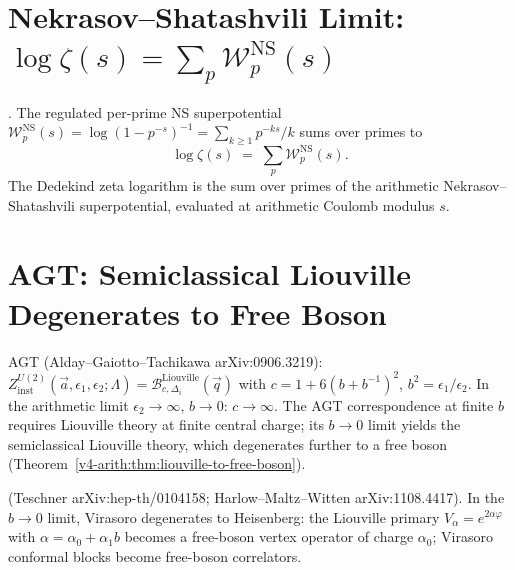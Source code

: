 \section{Nekrasov--Shatashvili Limit: \(\log\zeta(s)=\sum_{p}\mathcal{W}^{\mathrm{NS}}_{p}(s)\)}
\label{v4-arith:nk:NS-limit}

\begin{theorem}
\label{v4-arith:thm:NS-identity}
\ClaimStatusProvedHere. The regulated per-prime NS superpotential
\(\mathcal{W}^{\mathrm{NS}}_{p}(s)=\log(1-p^{-s})^{-1}=\sum_{k\geq 1}p^{-ks}/k\)
sums over primes to
\begin{equation}
\boxed{\;\log\zeta(s)\;=\;\sum_{p}\mathcal{W}^{\mathrm{NS}}_{p}(s).\;}
\end{equation}
The Dedekind zeta logarithm is the sum over primes of the
arithmetic Nekrasov--Shatashvili superpotential, evaluated at
arithmetic Coulomb modulus \(s\).
\end{theorem}

\section{AGT: Semiclassical Liouville Degenerates to Free Boson}
\label{v4-arith:nk:AGT-degenerate}

\begin{remark}
AGT (Alday--Gaiotto--Tachikawa arXiv:0906.3219):
\(Z^{U(2)}_{\mathrm{inst}}(\vec a,\epsilon_{1},\epsilon_{2};\Lambda)=
\mathcal{B}^{\mathrm{Liouville}}_{c,\Delta_{i}}(\vec q)\)
with \(c=1+6(b+b^{-1})^{2}\), \(b^{2}=\epsilon_{1}/\epsilon_{2}\). In
the arithmetic limit \(\epsilon_{2}\to\infty\), \(b\to 0\): \(c\to\infty\).
The AGT correspondence at finite \(b\) requires Liouville theory at finite central charge; its
\(b\to 0\) limit yields the semiclassical Liouville theory, which degenerates further to a free
boson (Theorem~\ref{v4-arith:thm:liouville-to-free-boson}).
\end{remark}

\begin{theorem}
\label{v4-arith:thm:liouville-to-free-boson}
\ClaimStatusProvedElsewhere (Teschner arXiv:hep-th/0104158;
Harlow--Maltz--Witten arXiv:1108.4417). In the \(b\to 0\) limit,
Virasoro degenerates to Heisenberg: the Liouville primary
\(V_{\alpha}=e^{2\alpha\varphi}\) with \(\alpha=\alpha_{0}+\alpha_{1}b\)
becomes a free-boson vertex operator of charge \(\alpha_{0}\);
Virasoro conformal blocks become free-boson correlators.
\end{theorem}

